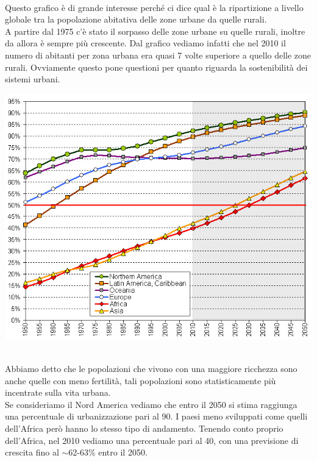 \documentclass[a4paper,12pt, oneside]{book}
\begin{document}
    \leavevmode\\
    Questo grafico è di grande interesse perché ci dice qual è la ripartizione a livello globale tra la popolazione abitativa delle zone urbane da quelle rurali.\\
    A partire dal 1975 c'è stato il sorpasso delle zone urbane su quelle rurali, inoltre da allora è sempre più crescente. Dal grafico vediamo infatti che nel 2010 il numero di abitanti per zona urbana era quasi 7 volte superiore a quello delle zone rurali. Ovviamente questo pone questioni per quanto riguarda la sostenibilità dei sistemi urbani.
    \leavevmode\\
    \begin{center}
    	\includegraphics[width=0.7\linewidth]{"Immagini/worldurbanpop"}
    \end{center}
    \leavevmode\\
    Abbiamo detto che le popolazioni che vivono con una maggiore ricchezza sono anche quelle con meno fertilità, tali popolazioni sono statisticamente più incentrate sulla vita urbana.\\
    Se consideriamo il Nord America vediamo che entro il 2050 si stima raggiunga una percentuale di urbanizzazione pari al 90\textdiscount. I paesi meno sviluppati come quelli dell'Africa però hanno lo stesso tipo di andamento. Tenendo conto proprio dell'Africa, nel 2010 vediamo una percentuale pari al 40\textdiscount, con una previsione di crescita fino al $\sim$62-63\% entro il 2050.
    \leavevmode\\
\end{document}
